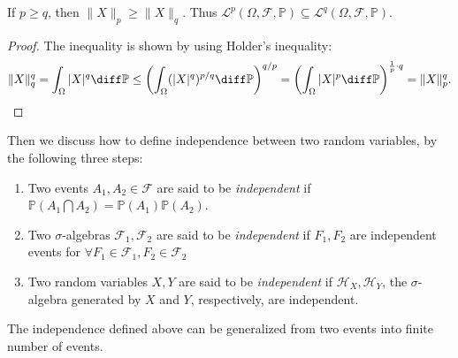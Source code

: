 \begin{proposition}
If $p\ge q$, then $\|X\|_p\ge\|X\|_q$. Thus $\mathcal{L}^p(\Omega,\mathcal{F},\mathbb{P})\subseteq\mathcal{L}^q(\Omega,\mathcal{F},\mathbb{P})$.
\end{proposition}
\begin{proof}
The inequality is shown by using Holder's inequality:
\[
\|X\|_q^q=\int_\Omega|X|^q\diff\mathbb{P}
\le
\left(\int_\Omega(|X|^q)^{p/q}\diff\mathbb{P}\right)^{q/p}
=
\left(
\int_\Omega|X|^p\diff\mathbb{P}
\right)^{\frac{1}{p}\cdot q}
=
\|X\|_p^q.
\]
\end{proof}

Then we discuss how to define independence between two random variables, by the following three steps:
\begin{definition}[Independence]
\begin{enumerate}
\item
Two events $A_1,A_2\in\mathcal{F}$ are said to be \emph{independent} if
$
\mathbb{P}(A_1\bigcap A_2)=\mathbb{P}(A_1)\mathbb{P}(A_2).
$
\item
Two $\sigma$-algebras $\mathcal{F}_1,\mathcal{F}_2$ are said to be \emph{independent} 
if $F_1,F_2$ are independent events for $\forall F_1\in\mathcal{F}_1,F_2\in\mathcal{F}_2$
\item
Two random variables $X,Y$ are said to be \emph{independent} if $\mathcal{H}_X,\mathcal{H}_Y$, the $\sigma$-algebra generated by $X$ and $Y$, respectively, are independent.
\end{enumerate}
\end{definition}

\begin{remark}
The independence defined above can be generalized from two events 
into finite number of events.
\end{remark}

